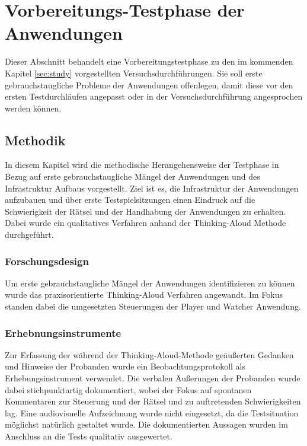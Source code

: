\chapter{Vorbereitungs-Testphase der Anwendungen}\label{sec:pre-study}
Dieser Abschnitt behandelt eine Vorbereitungstestphase zu den im kommenden Kapitel \ref{sec:study} vorgestellten Versuchsdurchführungen. Sie soll erste gebrauchstaugliche Probleme der Anwendungen offenlegen, damit diese vor den ersten Testdurchläufen angepasst oder in der Versuchsdurchführung angesprochen werden können.

\section{Methodik}
In diesem Kapitel wird die methodische Herangehensweise der Testphase in Bezug auf erste gebrauchstaugliche Mängel der Anwendungen und des Infrastruktur Aufbaus vorgestellt. Ziel ist es, die Infrastruktur der Anwendungen aufzubauen und über erste Testspielsitzungen einen Eindruck auf die Schwierigkeit der Rätsel und der Handhabung der Anwendungen zu erhalten. Dabei wurde ein qualitatives Verfahren anhand der Thinking-Aloud Methode durchgeführt.

\subsection{Forschungsdesign}
Um erste gebrauchstaugliche Mängel der Anwendungen identifizieren zu können wurde das praxisorientierte Thinking-Aloud Verfahren angewandt. Im Fokus standen dabei die umgesetzten Steuerungen der Player und Watcher Anwendung.

\subsection{Erhebnungsinstrumente}
Zur Erfassung der während der Thinking-Aloud-Methode geäußerten Gedanken und Hinweise der Probanden wurde ein Beobachtungsprotokoll als Erhebungsinstrument verwendet. Die verbalen Äußerungen der Probanden wurde dabei stichpunktartig dokumentiert, wobei der Fokus auf spontanen Kommentaren zur Steuerung und der Rätsel und zu auftretenden Schwierigkeiten lag. Eine audiovisuelle Aufzeichnung wurde nicht eingesetzt, da die Testsituation möglichst natürlich gestaltet wurde. Die dokumentierten Aussagen wurden im Anschluss an die Tests qualitativ ausgewertet.

